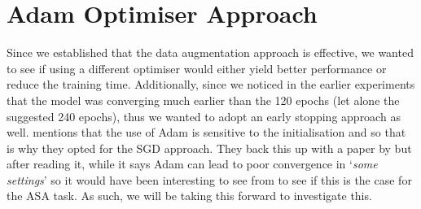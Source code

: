 \documentclass[logo,bsc,singlespacing,parskip,online]{infthesis}
\begin{document}
\section{Adam Optimiser Approach}
Since we established that the data augmentation approach is effective, we wanted to see 
if using a different optimiser would either yield better performance or reduce the 
training time. Additionally, since we noticed in the earlier experiments 
that the model was converging much earlier than the 120 epochs (let alone the suggested 
240 epochs), thus we wanted to adopt an early stopping approach as well.
\citet{Huwel2020HearDS} mentions that the use of Adam is sensitive to the initialisation 
and so that is why they opted for the SGD approach. 
They back this up with a paper by \citet{} 
but after reading it, while it says 
Adam can lead to poor convergence in `\textit{some settings}'
so it would have been interesting to see from \citet{Huwel2020HearDS}
to see if this is the case for the ASA task. As such, 
we will be taking this forward to investigate this.
\end{document}
